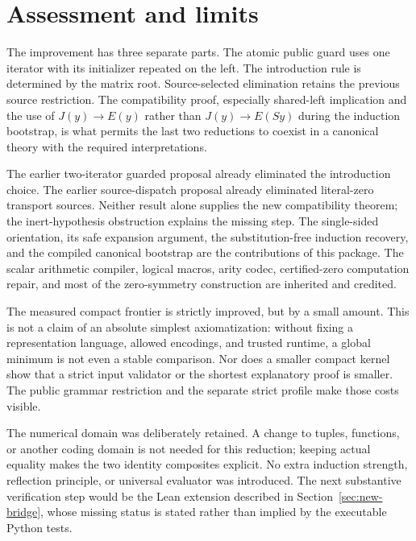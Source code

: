 \section{Assessment and limits}
\label{sec:assessment}

The improvement has three separate parts.  The atomic public guard
uses one iterator with its initializer repeated on the left.  The
introduction rule is determined by the matrix root.  Source-selected
elimination retains the previous source restriction.  The compatibility
proof, especially shared-left implication and the use of
$J(y)\to E(y)$ rather than $J(y)\to E(Sy)$ during the induction
bootstrap, is what permits the last two reductions to coexist in a
canonical theory with the required interpretations.

The earlier two-iterator guarded proposal already eliminated the
introduction choice.  The earlier source-dispatch proposal already
eliminated literal-zero transport sources.  Neither result alone
supplies the new compatibility theorem; the inert-hypothesis
obstruction explains the missing step.  The single-sided orientation,
its safe expansion argument, the substitution-free induction recovery,
and the compiled canonical bootstrap are the contributions of this
package.  The scalar arithmetic compiler, logical macros, arity codec,
certified-zero computation repair, and most of the zero-symmetry
construction are inherited and credited.

The measured compact frontier is strictly improved, but by a small
amount.  This is not a claim of an absolute simplest axiomatization:
without fixing a representation language, allowed encodings, and
trusted runtime, a global minimum is not even a stable comparison.
Nor does a smaller compact kernel show that a strict input validator
or the shortest explanatory proof is smaller.  The public grammar
restriction and the separate strict profile make those costs visible.

The numerical domain was deliberately retained.  A change to tuples,
functions, or another coding domain is not needed for this reduction;
keeping actual equality makes the two identity composites explicit.
No extra induction strength, reflection principle, or universal
evaluator was introduced.  The next substantive verification step
would be the Lean extension described in Section~\ref{sec:new-bridge},
whose missing status is stated rather than implied by the executable
Python tests.
